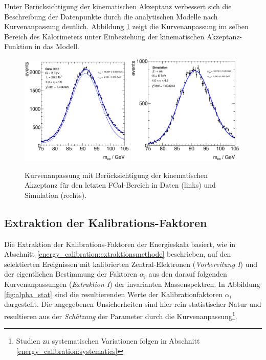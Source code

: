 Unter Berücksichtigung der kinematischen Akzeptanz verbessert sich die
Beschreibung der Datenpunkte durch die analytischen Modelle nach
Kurvenanpassung deutlich. Abbildung \ref{fig:good_example_fit} zeigt die
Kurvenanpassung im selben Bereich des Kalorimeters unter Einbeziehung der
kinematischen Akzeptanz-Funktion in das Modell.

\begin{figure}
    \centering
    \includegraphics[width=0.48\textwidth]{plots/fit_data_p40}
    \hfill
    \includegraphics[width=0.5\textwidth]{plots/fit_mc_p40}
    \caption[Kurvenanpassung mit Berücksichtigung der kinematischen Akzeptanz]
        {Kurvenanpassung mit Berücksichtigung der kinematischen Akzeptanz für
        den letzten \acs{FCal}-Bereich in Daten (links) und Simulation
        (rechts).}
    \label{fig:good_example_fit}
\end{figure}



\subsection{Extraktion der Kalibrations-Faktoren}
\label{energy_calibration:extraction_energy_scales}
Die Extraktion der Kalibrations-Faktoren der Energieskala basiert, wie in
Abschnitt \ref{energy_calibration:extraktionsmethode}
beschrieben, auf den selektierten Ereignissen mit kalibrierten
Zentral-Elektronen (\textit{Vorbereitung I}) und der eigentlichen Bestimmung
der Faktoren $\alpha_i$ aus den darauf folgenden Kurvenanpassungen
(\textit{Extraktion I}) der invarianten Massenspektren. In Abbildung
\ref{fig:alpha_stat} sind die resultierenden Werte der Kalibrationfaktoren
$\alpha_i$ dargestellt. Die angegebenen Unsicherheiten sind hier rein
statistischer Natur und resultieren aus der \textit{Schätzung} der Parameter
durch die Kurvenanpassung\footnote{Studien zu systematischen Variationen folgen
in Abschnitt \ref{energy_calibration:systematics}}.

